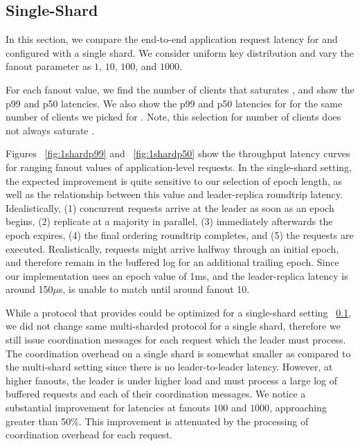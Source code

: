 \subsection{Single-Shard}
In this section, we compare the end-to-end application request latency for \system and \mpaxos configured with a single shard. We consider uniform key distribution and vary the fanout parameter as $1$, $10$, $100$, and $1000$.

For each fanout value, we find the number of clients that saturates \system, and show the p99 and p50 latencies. We also show the p99 and p50 latencies for \mpaxos for the same number of clients we picked for \system. Note, this selection for number of clients does not always saturate \mpaxos.

Figures ~\ref{fig:1shardp99} and ~\ref{fig:1shardp50} show the throughput latency curves for ranging fanout values of application-level requests. In the single-shard setting, the expected improvement is quite sensitive to our selection of epoch length, as well as the relationship between this value and leader-replica roundtrip latency. Idealistically, (1) concurrent requests arrive at the leader as soon as an epoch begins, (2) replicate at a majority in parallel, (3) immediately afterwards the epoch expires, (4) the final ordering roundtrip completes, and (5) the requests are executed. Realistically, requests might arrive halfway through an initial epoch, and therefore remain in the buffered log for an additional trailing epoch. Since our implementation uses an epoch value of 1ms, and the leader-replica latency is around 150$\mu$s, \system is unable to match \mpaxos until around fanout 10. %

While a protocol that provides \mdl could be optimized for a single-shard setting ~\ref{}, we did not change same multi-sharded protocol for a single shard, therefore we still issue coordination messages for each request which the leader must process. The coordination overhead on a single shard is somewhat smaller as compared to the multi-shard setting since there is no leader-to-leader latency. However, at higher fanouts, the leader is under higher load and must process a large log of buffered requests and each of their coordination messages. We notice a substantial improvement for latencies at fanouts $100$ and $1000$, approaching greater than 50\%. This improvement is attenuated by the processing of coordination overhead for each request.



